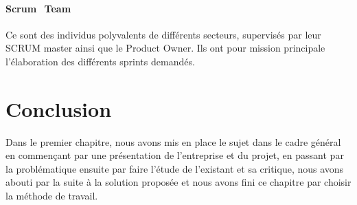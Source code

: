 \paragraph{Scrum\textcolor{white}{I} Team}
Ce sont des individus polyvalents de différents secteurs, supervisés par leur SCRUM master ainsi que le Product Owner. Ils ont pour mission principale l’élaboration des différents sprints demandés.


\section*{Conclusion}
Dans le premier chapitre, nous avons mis en place le sujet dans le cadre général en commençant par une présentation de l’entreprise et du projet, en passant par la problématique ensuite par faire l’étude de l’existant et sa critique, nous avons abouti par la suite à la solution proposée et nous avons fini ce chapitre par choisir la méthode de travail.
